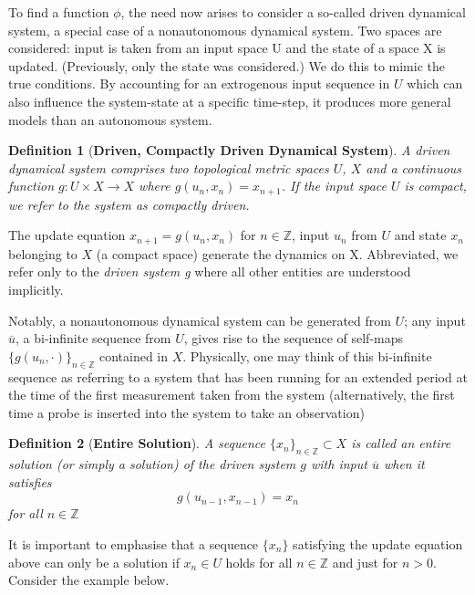 \documentclass[a4paper,12pt,twoside]{report}
\newtheorem{Definition}{Definition}[]
\begin{document}
To find a function $\phi$, the need  now arises to consider a so-called driven dynamical system, a special case of a nonautonomous dynamical system. Two spaces are considered: input is taken from an input space U and the state of a space X is updated. (Previously, only the state was considered.)
We do this to mimic the true conditions. By accounting for an extrogenous input sequence in $U$ which can also influence the  system-state at a specific time-step, it produces more general models than an autonomous system.

\begin{Definition}
  [\bf Driven, Compactly Driven Dynamical System] \label{Dfn_DDS} \rm
A driven dynamical system comprises two topological metric spaces $U$, $X$ and a continuous function  $g:U\times{X}\to{X}$ where $g(u_n, x_n)=x_{n+1}$.
If the input space $U$ is compact, we refer to the system as compactly driven. 
\end{Definition}

The update equation $x_{n+1} = g(u_n,x_n)$ for $n \in\mathbb{Z}$, input $u_n$ from $U$ and state $x_n$ belonging to $X$ (a compact space) generate the dynamics on X. 
Abbreviated, we refer only to the \textit{driven system g} where all other entities are understood implicitly.

Notably, a nonautonomous dynamical system can be generated from $U$; any input $\overline{u}$, a bi-infinite sequence from $U$, gives rise to the sequence of self-maps $\{g(u_n, \cdot)\}_{n\in\mathbb{Z}}$ contained in $X$.
Physically, one may think of this bi-infinite sequence as referring to a system that has been running for an extended period at the time of the first measurement taken from the system (alternatively, the first time a probe is inserted into the system to take an observation)

\begin{Definition}
  [\bf Entire Solution] \label{Dfn_Soln} \rm
  A sequence $\{x_n\}_{n\in\mathbb{Z}}\subset X$ is called an entire solution (or simply a solution) of the driven system  $g$ with input $\overline{u}$ when it satisfies 
  \[g(u_{n-1}, x_{n-1})=x_n\] for all $n\in\mathbb{Z}$
\end{Definition}

It is important to emphasise that a sequence $\{x_n\}$ satisfying the update equation above can only be a solution if $x_n\in{U}$ holds for all $n\in\mathbb{Z}$ and just for $n>0$. Consider the example below.
\end{document}
